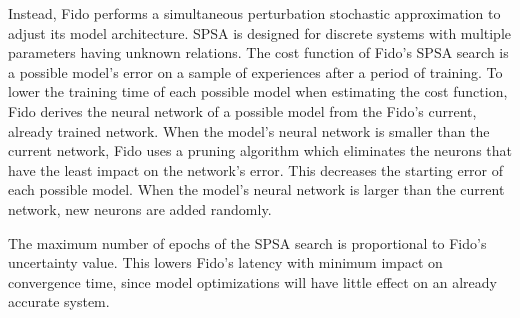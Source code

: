 Instead, Fido performs a simultaneous perturbation stochastic approximation to adjust its model architecture. SPSA is designed for discrete systems with multiple parameters having unknown relations. The cost function of Fido's SPSA search is a possible model's error on a sample of experiences after a period of training. To lower the training time of each possible model when estimating the cost function, Fido derives the neural network of a possible model from the Fido's current, already trained network. When the model's neural network is smaller than the current network, Fido uses a pruning algorithm which eliminates the neurons that have the least impact on the network's error. This decreases the starting error of each possible model. When the model's neural network is larger than the current network, new neurons are added randomly.

The maximum number of epochs of the SPSA search is proportional to Fido's uncertainty value. This lowers Fido's latency with minimum impact on convergence time, since model optimizations will have little effect on an already accurate system.
